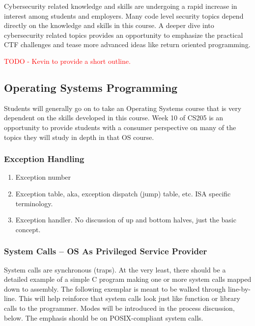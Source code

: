 \documentclass[12pt,letterpaper]{article}
\begin{document}
	Cybersecurity related knowledge and skills are undergoing a rapid increase in interest among students and employers. Many code level security topics depend directly on the knowledge and skills in this course. A deeper dive into cybersecurity related topics provides an opportunity to emphasize the practical CTF challenges and tease more advanced ideas like return oriented programming.
	
	\textcolor{red}{TODO - Kevin to provide a short outline.}

	\subsection{Operating Systems Programming}

	Students will generally go on to take an Operating Systems course that is very dependent on the skills developed in this course. Week 10 of CS205 is an opportunity to provide students with a consumer perspective on many of the topics they will study in depth in that OS course.
	
	\subsubsection{Exception Handling}
	\begin{enumerate}
		\item Exception number
		\item Exception table, aka, exception dispatch (jump) table, etc. ISA specific terminology.
		\item Exception handler. No discussion of up and bottom halves, just the basic concept.
	\end{enumerate}
		
	\subsubsection{System Calls -- OS As Privileged Service Provider}

	System calls are synchronous (traps). At the very least, there should be a detailed example of a simple C program making one or more system calls mapped down to assembly. The following exemplar is meant to be walked through line-by-line. This will help reinforce that system calls look just like function or library calls to the programmer. Modes will be introduced in the process discussion, below. The emphasis should be on POSIX-compliant system calls.
	
\end{document}
